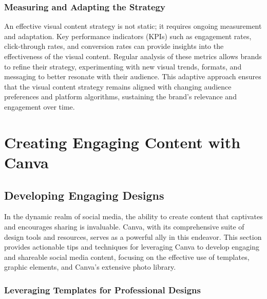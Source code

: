 \documentclass[
]{book}
\begin{document}
\hypertarget{measuring-and-adapting-the-strategy}{%
\subsubsection*{Measuring and Adapting the Strategy}\label{measuring-and-adapting-the-strategy}}

An effective visual content strategy is not static; it requires ongoing measurement and adaptation. Key performance indicators (KPIs) such as engagement rates, click-through rates, and conversion rates can provide insights into the effectiveness of the visual content. Regular analysis of these metrics allows brands to refine their strategy, experimenting with new visual trends, formats, and messaging to better resonate with their audience. This adaptive approach ensures that the visual content strategy remains aligned with changing audience preferences and platform algorithms, sustaining the brand's relevance and engagement over time.

\hypertarget{creating-engaging-content-with-canva}{%
\section{Creating Engaging Content with Canva}\label{creating-engaging-content-with-canva}}

\hypertarget{developing-engaging-designs}{%
\subsection*{Developing Engaging Designs}\label{developing-engaging-designs}}

In the dynamic realm of social media, the ability to create content that captivates and encourages sharing is invaluable. Canva, with its comprehensive suite of design tools and resources, serves as a powerful ally in this endeavor. This section provides actionable tips and techniques for leveraging Canva to develop engaging and shareable social media content, focusing on the effective use of templates, graphic elements, and Canva's extensive photo library.

\hypertarget{leveraging-templates-for-professional-designs}{%
\subsubsection*{Leveraging Templates for Professional Designs}\label{leveraging-templates-for-professional-designs}}
\end{document}
